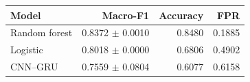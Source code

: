 \begin{tabular}{lrrr}
\toprule
Model & Macro-F1 & Accuracy & FPR \\
\midrule
Random forest & 0.8372 $\pm$ 0.0010 & 0.8480 & 0.1885 \\
Logistic & 0.8018 $\pm$ 0.0000 & 0.6806 & 0.4902 \\
CNN--GRU & 0.7559 $\pm$ 0.0804 & 0.6077 & 0.6158 \\
\bottomrule
\end{tabular}
